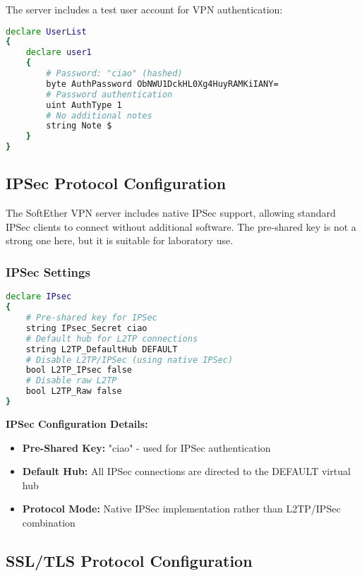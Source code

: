 The server includes a test user account for VPN authentication:

\begin{lstlisting}[language=bash]
declare UserList
{
    declare user1
    {
        # Password: "ciao" (hashed)
        byte AuthPassword ObNWU1DckHL0Xg4HuyRAMKiIANY= 
        # Password authentication   
        uint AuthType 1                    
        # No additional notes              
        string Note $                                                    
    }
}
\end{lstlisting}

\subsection{IPSec Protocol Configuration}

The SoftEther VPN server includes native IPSec support, allowing standard IPSec clients to connect without additional software. The pre-shared key is not a strong one here, but it is suitable for laboratory use.

\subsubsection{IPSec Settings}

\begin{lstlisting}[language=bash]
declare IPsec
{               
    # Pre-shared key for IPSec  
    string IPsec_Secret ciao                   
    # Default hub for L2TP connections
    string L2TP_DefaultHub DEFAULT    
    # Disable L2TP/IPSec (using native IPSec)         
    bool L2TP_IPsec false                      
    # Disable raw L2TP
    bool L2TP_Raw false                        
}
\end{lstlisting}

\textbf{IPSec Configuration Details:}

\begin{itemize}
    \item \textbf{Pre-Shared Key:} "ciao" - used for IPSec authentication
    \item \textbf{Default Hub:} All IPSec connections are directed to the DEFAULT virtual hub
    \item \textbf{Protocol Mode:} Native IPSec implementation rather than L2TP/IPSec combination
\end{itemize}

\subsection{SSL/TLS Protocol Configuration}

